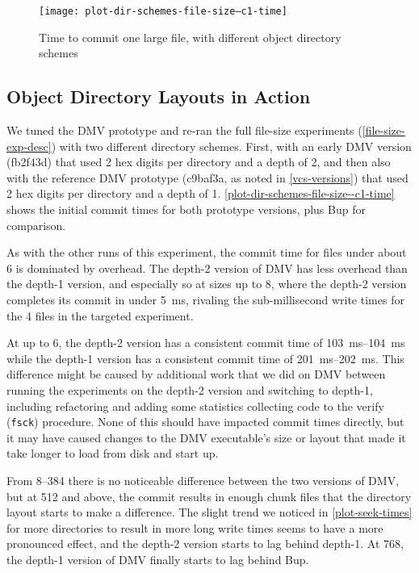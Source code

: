 %

\begin{figure}[b!]
    \caption{Time to commit one large file, with different object directory
    schemes}
    \label{plot-dir-schemes-file-size--c1-time}
    \centering

    \explainlogsubfig

    \texttt{[image: plot-dir-schemes-file-size--c1-time]}
\end{figure}

\subsection{Object Directory Layouts in Action}

We tuned the DMV prototype and re-ran the full file-size experiments
(\autoref{file-size-exp-desc}) with two different directory schemes. First, with
an early DMV version (fb2f43d) that used \num{2} hex digits per directory and a
depth of \num{2}, and then also with the reference DMV prototype (c9baf3a, as
noted in \autoref{vcs-versions}) that used \num{2} hex digits per directory and
a depth of \num{1}. \autoref{plot-dir-schemes-file-size--c1-time} shows the
initial commit times for both prototype versions, plus Bup for comparison.

As with the other runs of this experiment, the commit time for files under about
\SI{6}{\mib} is dominated by overhead. The depth-\num{2} version of DMV has less
overhead than the depth-\num{1} version, and especially so at sizes up to
\SI{8}{\kib}, where the depth-\num{2} version completes its commit in under
\SI{5}{\ms}, rivaling the sub-millisecond write times for the \SI{4}{\kib} files
in the targeted experiment.

At up to \SI{6}{\mib}, the depth-\num{2} version has a consistent commit time of
\SIrange{103}{104}{\ms} while the depth-\num{1} version has a consistent commit
time of \SIrange{201}{202}{\ms}. This difference might be caused by additional
work that we did on DMV between running the experiments on the depth-\num{2}
version and switching to depth-\num{1}, including refactoring and adding some
statistics collecting code to the verify (\lstinline{fsck}) procedure. None of
this should have impacted commit times directly, but it may have caused changes
to the DMV executable's size or layout that made it take longer to load from
disk and start up.

From \SIrange{8}{384}{\mib} there is no noticeable difference between the two
versions of DMV, but at \SI{512}{\mib} and above, the commit results in enough
chunk files that the directory layout starts to make a difference. The slight
trend we noticed in \autoref{plot-seek-times} for more directories to result in
more long write times seems to have a more pronounced effect, and the
depth-\num{2} version starts to lag behind depth-\num{1}. At \SI{768}{\mib}, the
depth-\num{1} version of DMV finally starts to lag behind Bup.

